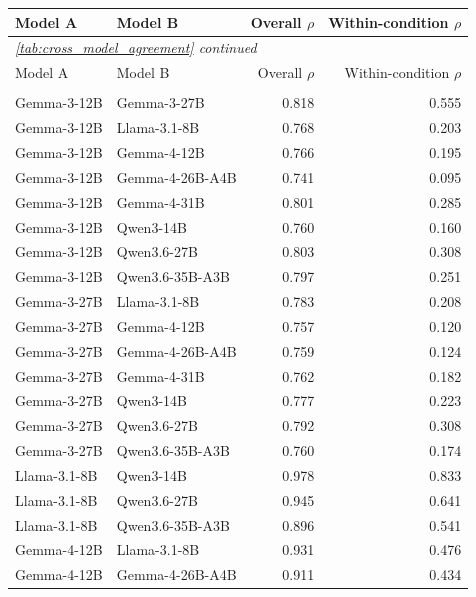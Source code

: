 \begingroup
\small
\begin{longtable}{@{}llrr@{}}
\toprule
Model A & Model B & Overall $\rho$ & Within-condition $\rho$ \\
\midrule
\endfirsthead
\multicolumn{4}{l}{\textit{\autoref{tab:cross_model_agreement} continued}} \\
\toprule
Model A & Model B & Overall $\rho$ & Within-condition $\rho$ \\
\midrule
\endhead
\bottomrule
\endfoot
\multicolumn{4}{l}{\textit{Warmth}} \\
Gemma-3-12B & Gemma-3-27B & 0.818 & 0.555 \\
Gemma-3-12B & Llama-3.1-8B & 0.768 & 0.203 \\
Gemma-3-12B & Gemma-4-12B & 0.766 & 0.195 \\
Gemma-3-12B & Gemma-4-26B-A4B & 0.741 & 0.095 \\
Gemma-3-12B & Gemma-4-31B & 0.801 & 0.285 \\
Gemma-3-12B & Qwen3-14B & 0.760 & 0.160 \\
Gemma-3-12B & Qwen3.6-27B & 0.803 & 0.308 \\
Gemma-3-12B & Qwen3.6-35B-A3B & 0.797 & 0.251 \\
Gemma-3-27B & Llama-3.1-8B & 0.783 & 0.208 \\
Gemma-3-27B & Gemma-4-12B & 0.757 & 0.120 \\
Gemma-3-27B & Gemma-4-26B-A4B & 0.759 & 0.124 \\
Gemma-3-27B & Gemma-4-31B & 0.762 & 0.182 \\
Gemma-3-27B & Qwen3-14B & 0.777 & 0.223 \\
Gemma-3-27B & Qwen3.6-27B & 0.792 & 0.308 \\
Gemma-3-27B & Qwen3.6-35B-A3B & 0.760 & 0.174 \\
Llama-3.1-8B & Qwen3-14B & 0.978 & 0.833 \\
Llama-3.1-8B & Qwen3.6-27B & 0.945 & 0.641 \\
Llama-3.1-8B & Qwen3.6-35B-A3B & 0.896 & 0.541 \\
Gemma-4-12B & Llama-3.1-8B & 0.931 & 0.476 \\
Gemma-4-12B & Gemma-4-26B-A4B & 0.911 & 0.434 \\

\end{longtable}
